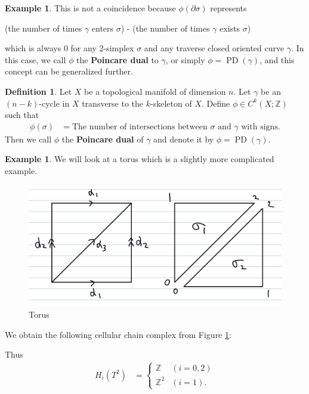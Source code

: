\documentclass[psamsfonts]{amsart}
\theoremstyle{definition}
\newtheorem{defn}[thm]{Definition}
\newtheorem{exmp}[thm]{Example}
\theoremstyle{rem}
\DeclareMathOperator{\PD}{PD}
\numberwithin{equation}{section}
\begin{document}
\begin{exmp}
  This is not a coincidence because $\phi(\partial\sigma)$ represents 
  \begin{center}
    (the number of times $\gamma$ enters $\sigma$) - (the number of times $\gamma$ exists $\sigma$)
  \end{center}
  which is always 0 for any 2-simplex $\sigma$ and any traverse closed oriented curve $\gamma$.
  In this case, we call $\phi$ the \textbf{Poincare dual} to $\gamma$, or simply $\phi = \PD(\gamma)$, and this concept can be generalized further.
\end{exmp}

\begin{defn}
  Let $X$ be a topological manifold of dimension $n$.
  Let $\gamma$ be an $(n - k)$-cycle in $X$ transverse to the $k$-skeleton of $X$.
  Define $\phi \in C^{k}(X; \mathbb{Z})$ such that
  \begin{align*}
    \phi(\sigma) &= \text{The number of intersections between $\sigma$ and $\gamma$ with signs}.
  \end{align*}
  Then we call $\phi$ the \textbf{Poincare dual} of $\gamma$ and denote it by $\phi = \PD(\gamma)$.
\end{defn}

\begin{exmp}
  We will look at a torus which is a slightly more complicated example.
  \begin{figure}[!htb]
    \includegraphics[width=.5\linewidth]{img/torus.jpeg}
    \caption{Torus}
    \label{fig:torus}
  \end{figure}
  We obtain the following cellular chain complex from Figure \ref{fig:torus}:
  \begin{center}
  \end{center}
  Thus
  \begin{align*}
    H_i(T^2) &= \begin{cases}
      \mathbb{Z}   & (i = 0, 2) \\
      \mathbb{Z}^2 & (i = 1).
    \end{cases}
  \end{align*}
\end{exmp}
\end{document}
